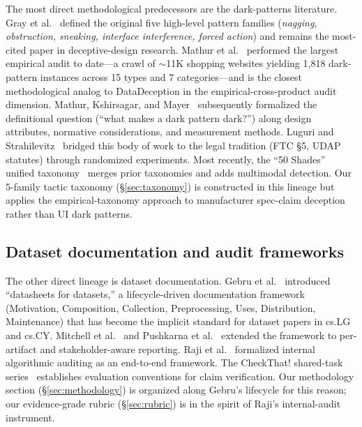 \documentclass{article}
\begin{document}
The most direct methodological predecessors are the dark-patterns literature. Gray et al.~\cite{gray_darkpatterns_2018} defined the original five high-level pattern families (\emph{nagging, obstruction, sneaking, interface interference, forced action}) and remains the most-cited paper in deceptive-design research. Mathur et al.~\cite{mathur_darkpatterns_2019} performed the largest empirical audit to date---a crawl of $\sim$11K shopping websites yielding 1{,}818 dark-pattern instances across 15 types and 7 categories---and is the closest methodological analog to DataDeception in the empirical-cross-product audit dimension. Mathur, Kshirsagar, and Mayer~\cite{mathur_darkdark_2021} subsequently formalized the definitional question (``what makes a dark pattern dark?'') along design attributes, normative considerations, and measurement methods. Luguri and Strahilevitz~\cite{luguri_darkpatterns_2021} bridged this body of work to the legal tradition (FTC \S 5, UDAP statutes) through randomized experiments. Most recently, the ``50 Shades'' unified taxonomy~\cite{fifty_shades_2025} merges prior taxonomies and adds multimodal detection. Our 5-family tactic taxonomy (\S\ref{sec:taxonomy}) is constructed in this lineage but applies the empirical-taxonomy approach to manufacturer spec-claim deception rather than UI dark patterns.

\subsection{Dataset documentation and audit frameworks}\label{sec:rw_doc}

The other direct lineage is dataset documentation. Gebru et al.~\cite{gebru_datasheets_2021} introduced ``datasheets for datasets,'' a lifecycle-driven documentation framework (Motivation, Composition, Collection, Preprocessing, Uses, Distribution, Maintenance) that has become the implicit standard for dataset papers in cs.LG and cs.CY. Mitchell et al.~\cite{mitchell_modelcards_2019} and Pushkarna et al.~\cite{pushkarna_datacards_2022} extended the framework to per-artifact and stakeholder-aware reporting. Raji et al.~\cite{raji_accountability_2020} formalized internal algorithmic auditing as an end-to-end framework. The CheckThat! shared-task series~\cite{checkthat_2020} establishes evaluation conventions for claim verification. Our methodology section (\S\ref{sec:methodology}) is organized along Gebru's lifecycle for this reason; our evidence-grade rubric (\S\ref{sec:rubric}) is in the spirit of Raji's internal-audit instrument.
\end{document}
